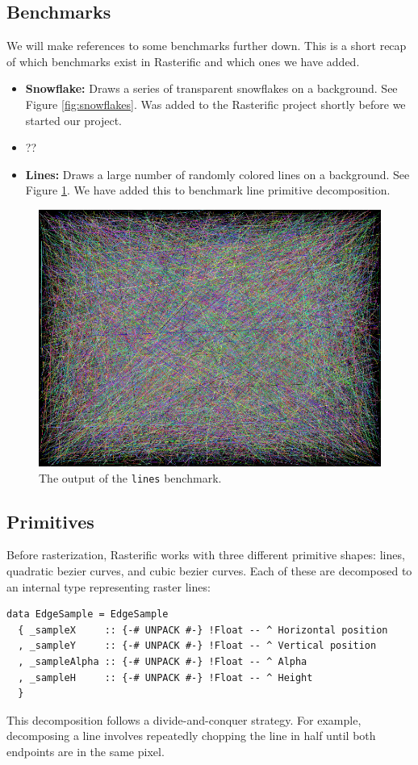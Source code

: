 \documentclass[12pt, a4paper]{article}
\begin{document}
\subsection{Benchmarks}
We will make references to some benchmarks further down. This is a short recap of which benchmarks exist in Rasterific and which ones we have added.
\begin{itemize}
\item \textbf{Snowflake:} Draws a series of transparent snowflakes on a background. See Figure \ref{fig:snowflakes}. Was added to the Rasterific project
   shortly before we started our project.
\item ??
\item \textbf{Lines:} Draws a large number of randomly colored lines on a background. See Figure \ref{fig:lines-benchmark}.
  We have added this to benchmark line primitive decomposition.
\end{itemize}
\begin{figure}[h!]
  \centering
  \includegraphics[width=.4\linewidth]{../lines}
  \caption{The output of the \texttt{lines} benchmark.}
  \label{fig:lines-benchmark}
\end{figure}

\subsection{Primitives}
Before rasterization, Rasterific works with three different primitive shapes:
lines, quadratic bezier curves, and cubic bezier curves. Each of these are decomposed
to an internal type representing raster lines:
\begin{lstlisting}[caption={\texttt{EdgeSample} type -- represents a raster line.}]
data EdgeSample = EdgeSample
  { _sampleX     :: {-# UNPACK #-} !Float -- ^ Horizontal position
  , _sampleY     :: {-# UNPACK #-} !Float -- ^ Vertical position
  , _sampleAlpha :: {-# UNPACK #-} !Float -- ^ Alpha
  , _sampleH     :: {-# UNPACK #-} !Float -- ^ Height
  }
\end{lstlisting}
This decomposition follows a divide-and-conquer strategy. For example, decomposing a line
involves repeatedly chopping the line in half until both endpoints are in the same pixel.
\end{document}
